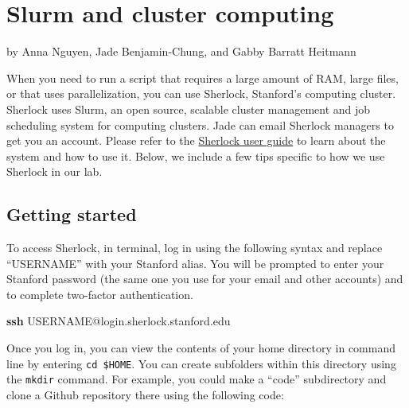 \documentclass[
]{book}
\newenvironment{Shaded}{\begin{snugshade}}{\end{snugshade}}
\newcommand{\BuiltInTok}[1]{#1}
\newcommand{\FunctionTok}[1]{\textcolor[rgb]{0.13,0.29,0.53}{\textbf{#1}}}
\newcommand{\NormalTok}[1]{#1}
\newcommand{\VariableTok}[1]{\textcolor[rgb]{0.00,0.00,0.00}{#1}}
\begin{document}
\chapter{Slurm and cluster computing}\label{slurm}

by Anna Nguyen, Jade Benjamin-Chung, and Gabby Barratt Heitmann

When you need to run a script that requires a large amount of RAM, large files, or that uses parallelization, you can use Sherlock, Stanford's computing cluster. Sherlock uses Slurm, an open source, scalable cluster management and job scheduling system for computing clusters. Jade can email Sherlock managers to get you an account. Please refer to the \href{https://www.sherlock.stanford.edu/docs/overview/introduction/}{Sherlock user guide} to learn about the system and how to use it. Below, we include a few tips specific to how we use Sherlock in our lab.

\section{Getting started}\label{getting-started-1}

To access Sherlock, in terminal, log in using the following syntax and replace ``USERNAME'' with your Stanford alias. You will be prompted to enter your Stanford password (the same one you use for your email and other accounts) and to complete two-factor authentication.

\begin{Shaded}
\begin{Highlighting}[]
\FunctionTok{ssh}\NormalTok{ USERNAME@login.sherlock.stanford.edu}
\end{Highlighting}
\end{Shaded}

Once you log in, you can view the contents of your home directory in command line by entering \texttt{cd\ \$HOME}. You can create subfolders within this directory using the \texttt{mkdir} command. For example, you could make a ``code'' subdirectory and clone a Github repository there using the following code:

\begin{Shaded}
\end{Shaded}
\end{document}
